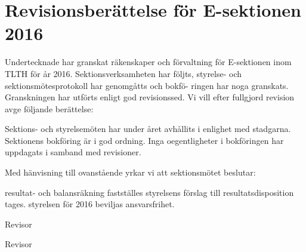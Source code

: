 \documentclass[./vt16.tex]{subfiles}
\begin{document}
\section{Revisionsberättelse för E-sektionen 2016}

Undertecknade har granskat räkenskaper och förvaltning för E-sektionen inom TLTH för år 2016.
Sektionsverksamheten har följts, styrelse- och sektionsmötesprotokoll har genomgåtts och bokfö-
ringen har noga granskats. Granskningen har utförts enligt god revisionssed. Vi vill efter fullgjord
revision avge följande berättelse:

Sektions- och styrelsemöten har under året avhållits i enlighet med stadgarna. Sektionens bokföring
är i god ordning. Inga oegentligheter i bokföringen har uppdagats i samband med revisioner.

Med hänvisning till ovanstående yrkar vi att sektionsmötet beslutar:

\begin{attsatser}
    \att resultat- och balansräkning fastställes
    \att styrelsens förslag till resultatsdisposition tages.
    \att styrelsen för 2016 beviljas ansvarsfrihet.
\end{attsatser}

\begin{signatures}{2}
    \mvh
    \signature{Jesper Ek}{Revisor}
    \signature{Hanna Nevalainen}{Revisor}
\end{signatures}
\end{document}
